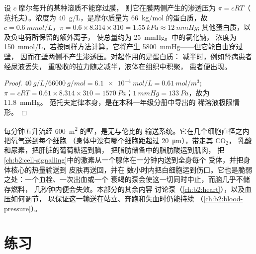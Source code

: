 \begin{theorem}[胶体渗透压]\label{thm:b2:blood-circulation:oncotic}
设 $c$ 摩尔每升的某种溶质不能穿过膜，
则它在膜两侧产生的渗透压为 $\pi = cRT$（
范托夫）。浓度为 \qty{40}{g/L}，是摩尔质量为
\qty{66}{kg/mol} 的蛋白质，故 $c = \qty{0.6}{mmol/L}$，$\pi =
0.6\times 8.314\times 310 = \qty{1.55}{kPa} \approx \qty{12}{mmHg}$;
其他蛋白质，以及负电荷所保留的额外离子，
使总量约为 \qty{25}{mmHg}。中的氯化钠，
浓度为 \qty{150}{mmol/L}，若按同样方法计算，它将产生
\qty{5800}{mmHg}——但它能自由穿过壁，
因而在壁两侧不产生渗透压。对起作用的是蛋白质：
减半时，例如肾病患者经尿液丢失，
重吸收的拉力随之减半，液体在组织中积聚，
患者便出现。
\end{theorem}
\begin{proof}
$\qty{40}{g/L}/\qty{66000}{g/mol} = \qty{6.1e-4}{mol/L} =
\qty{0.61}{mol/m^3}$; $\pi = cRT = 0.61\times 8.314\times 310 =
\qty{1570}{Pa}$；$\qty{1}{mmHg} = \qty{133}{Pa}$，故为 \qty{11.8}{mmHg}。
范托夫定律本身，是在本科一年级分册中导出的
稀溶液极限情形。
\end{proof}

\begin{example}[作为运输系统的循环]\label{ex:b2:blood-circulation:transport}
每分钟五升流经 \qty{600}{m^2} 的壁，是无与伦比的
输送系统。它在几个细胞直径之内把氧气送到每个细胞
（身体中没有哪个细胞距超过
\qty{20}{\micro m}），带走其 $\mathrm{CO_2}$，
乳酸和尿素，把肝脏的葡萄糖运到脑，
把脂肪储备中的脂肪酸运到肌肉，
把\cref{ch:b2:cell-signalling}中的激素从一个腺体在一分钟内送到全身每个
受体，并把身体核心的热量输送到
皮肤再送回，并在
数小时内把白细胞运到伤口。它也是脆弱之处：一个血栓、一次出血或一个
衰竭的泵会使这一切同时中止，而脑几乎不储存燃料，
几秒钟内便会失效。本部分的其余内容
讨论泵（\cref{ch:b2:heart}），以及血压如何调节，
以保证这一输送在站立、奔跑和失血时仍能持续
（\cref{ch:b2:blood-pressure}）。
\end{example}

\section{练习}

